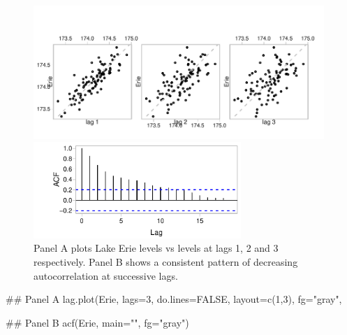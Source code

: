 \begin{figure}
\begin{Schunk}


\centerline{\includegraphics[width=0.98\textwidth]{figs/9-lagErie-1} }

\end{Schunk}
\vspace*{-3pt}

\begin{Schunk}


\centerline{\includegraphics[width=0.7\textwidth]{figs/9-acfErie-1} }

\end{Schunk}
\caption{Panel A plots Lake Erie levels vs levels at lags 1, 2 and 3
  respectively. Panel B shows a consistent pattern of decreasing
  autocorrelation at successive lags.
}\label{erie-lagplot}
\vspace*{-6pt}
\end{figure}

\begin{marginfigure}[-10cm]
\begin{Schunk}
\begin{Sinput}
## Panel A
lag.plot(Erie, lags=3,
         do.lines=FALSE,
         layout=c(1,3), fg="gray",
\end{Sinput}
\end{Schunk}
\begin{Schunk}
\begin{Sinput}
## Panel B
acf(Erie, main="", fg="gray")
\end{Sinput}
\end{Schunk}
\end{marginfigure}


